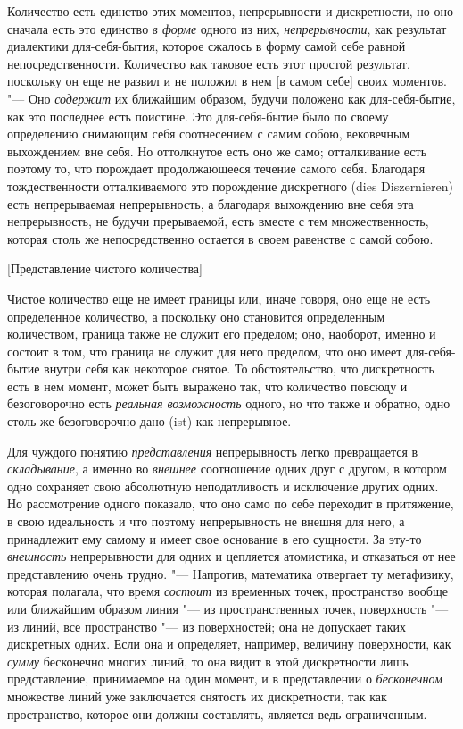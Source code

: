 Количество есть единство этих моментов, непрерывности и дискретности, но оно
сначала есть это единство {\em в форме} одного из них,
{\em непрерывности}, как результат диалектики
для-себя-бытия, которое сжалось в форму самой себе равной
непосредственности. Количество как таковое есть этот простой результат,
поскольку он еще не развил и не положил в нем [в самом себе] своих
моментов. "--- Оно {\em содержит} их ближайшим образом,
будучи положено как для-себя-бытие, как это последнее есть поистине. Это
для-себя-бытие было по своему определению снимающим себя соотнесением с
самим собою, вековечным выхождением вне себя. Но оттолкнутое есть оно же
само; отталкивание есть поэтому то, что порождает продолжающееся течение
самого себя. Благодаря тождественности отталкиваемого это порождение
дискретного (dies Diszernieren) есть непрерываемая непрерывность, а
благодаря выхождению вне себя эта непрерывность, не будучи прерываемой,
есть вместе с тем множественность, которая столь же непосредственно
остается в своем равенстве с самой собою.

%
  {[Представление чистого количества]}

Чистое количество еще не имеет границы или, иначе говоря, оно еще не есть
определенное количество, а поскольку оно становится определенным
количеством, граница также не служит его пределом; оно, наоборот, именно и
состоит в том, что граница не служит для него пределом, что оно имеет
для-себя-бытие внутри себя как некоторое снятое. То обстоятельство, что
дискретность есть в нем момент, может быть выражено так, что количество
повсюду и безоговорочно есть {\em реальная возможность} одного, но
что также и обратно, одно столь же безоговорочно дано (ist) как непрерывное.

Для чуждого понятию {\em представления} непрерывность
легко превращается в {\em складывание}, а именно во
{\em внешнее} соотношение одних друг с другом, в
котором одно сохраняет свою абсолютную неподатливость и исключение других
одних. Но рассмотрение одного показало, что оно само по себе переходит в
притяжение, в свою идеальность и что поэтому непрерывность не внешня для
него, а принадлежит ему самому и имеет свое основание в его сущности. За
эту-то {\em внешность} непрерывности для одних и
цепляется атомистика, и отказаться от нее представлению очень трудно. "---
Напротив, математика отвергает ту метафизику, которая полагала, что время
{\em состоит} из временных точек, пространство вообще
или ближайшим образом линия "--- из пространственных точек, поверхность "--- из
линий, все пространство "--- из поверхностей; она не допускает таких
дискретных одних. Если она и определяет, например, величину поверхности,
как {\em сумму} бесконечно многих линий, то она видит в
этой дискретности лишь представление, принимаемое на один момент, и в
представлении о {\em бесконечном} множестве линий уже
заключается снятость их дискретности, так как пространство, которое они
должны составлять, является ведь ограниченным.

